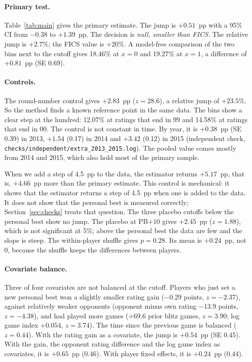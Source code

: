 \documentclass[11pt]{article}
\begin{document}
\paragraph{Primary test.} Table~\ref{tab:main} gives the primary estimate. The jump is $+0.51$~pp with a 95\% CI from $-0.38$ to $+1.39$~pp. The decision is \emph{null, smaller than FICS}. The relative jump is $+2.7\%$; the FICS value is $+20\%$. A model-free comparison of the two bins next to the cutoff gives 18.46\% at $x=0$ and 19.27\% at $x=1$, a difference of $+0.81$~pp (SE 0.69).

\paragraph{Controls.} The round-number control gives $+2.83$~pp ($z=28.6$), a relative jump of $+23.5\%$. So the method finds a known reference point in the same data. The bins show a clear step at the hundred: 12.07\% at ratings that end in 99 and 14.58\% at ratings that end in 00. The control is not constant in time. By year, it is $+0.38$~pp (SE 0.39) in 2013, $+1.54$ (0.17) in 2014 and $+3.42$ (0.12) in 2015 (independent check, \texttt{checks/independent/extra\_2013\_2015.log}). The pooled value comes mostly from 2014 and 2015, which also hold most of the primary sample.

When we add a step of 4.5~pp to the data, the estimator returns $+5.17$~pp, that is, $+4.66$~pp more than the primary estimate. This control is mechanical: it shows that the estimator returns a step of 4.5~pp when one is added to the data. It does not show that the personal best is measured correctly; Section~\ref{sec:checks} treats that question. The three placebo cutoffs below the personal best show no jump. The placebo at PB$+10$ gives $+2.45$~pp ($z=1.88$), which is not significant at 5\%; above the personal best the data are few and the slope is steep. The within-player shuffle gives $p=0.28$. Its mean is $+0.24$~pp, not 0, because the shuffle keeps the differences between players.

\paragraph{Covariate balance.} Three of four covariates are not balanced at the cutoff. Players who just set a new personal best won a slightly smaller rating gain ($-0.29$ points, $z=-2.37$), against relatively weaker opponents (opponent minus own rating $-13.9$ points, $z=-4.38$), and had played more games ($+69.6$ prior blitz games, $z=3.90$; log game index $+0.054$, $z=3.74$). The time since the previous game is balanced ($z=0.44$). With the rating gain as a covariate, the jump is $+0.54$~pp (SE 0.45). With the gain, the opponent rating difference and the log game index as covariates, it is $+0.65$~pp (0.46). With player fixed effects, it is $+0.24$~pp (0.44).
\end{document}
